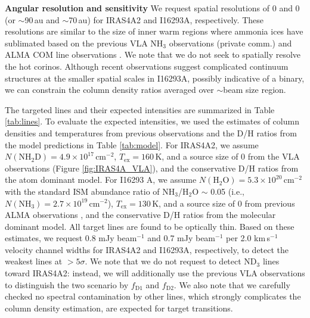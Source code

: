 \documentclass[12pt,a4paper]{article}  %
\begin{document}
\noindent \textbf{Angular resolution and sensitivity} \quad We request spatial resolutions of 0 and 0 (or $\sim$90\,au and $\sim$70\,au) for IRAS4A2 and I16293A, respectively. These resolutions are similar to the size of inner warm regions where ammonia ices have sublimated based on the previous VLA NH$_3$ observations (private comm.) and ALMA COM line observations \citep{Manigand20}. We note that we do not seek to spatially resolve the hot corinos. Although recent observations suggest complicated continuum structures at the smaller spatial scales in I16293A, possibly indicative of a binary, we can constrain the column density ratios averaged over $\sim$beam size region.

\smallskip
\noindent The targeted lines and their expected intensities are summarized in Table \ref{tab:lines}. To evaluate the expected intensities, we used the estimates of column densities and temperatures from previous observations and the D/H ratios from the model predictions in Table \ref{tab:model}. For IRAS4A2, we assume $N(\mathrm{NH_2D})=4.9\times10^{17}$\,cm$^{-2}$, $T_\mathrm{ex}=160$\,K, and a source size of 0 from the VLA observations (Figure \ref{fig:IRAS4A_VLA}), and the conservative D/H ratios from the atom dominant model. For I16293 A, we assume $N(\mathrm{H_2O}) = 5.3\times10^{20}$\,cm$^{-2}$ with the standard ISM abundance ratio of NH$_3$/H$_2$O $\sim$ 0.05 (i.e., $N(\mathrm{NH_3}) = 2.7\times10^{19}$\,cm$^{-2}$), $T_\mathrm{ex}=130$\,K, and a source size of 0 from previous ALMA observations \citep{Persson13, Manigand20}, and the conservative D/H ratios from the molecular dominant model. All target lines are found to be optically thin. Based on these estimates, we request 0.8 mJy beam$^{-1}$ and 0.7 mJy beam$^{-1}$ per 2.0 km\,s$^{-1}$ velocity channel widths for IRAS4A2 and I16293A, respectively, to detect the weakest lines at $>5\sigma$. We note that we do not request to detect ND$_3$ lines toward IRAS4A2: instead, we will additionally use the previous VLA observations to distinguish the two scenario by $f_\mathrm{D1}$ and $f_\mathrm{D2}$. We also note that we carefully checked no spectral contamination by other lines, which strongly complicates the column density estimation, are expected for target transitions.
\end{document}
